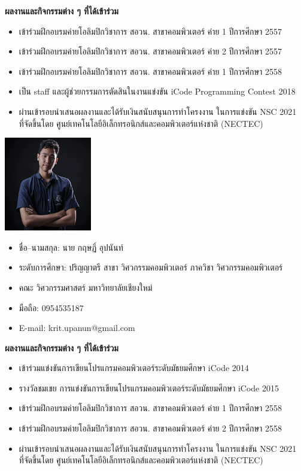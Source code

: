 \documentclass[semifinal]{cpecmu}
\begin{document}
\begin{biosketch}
\noindent \textbf{ผลงานและกิจกรรมต่าง ๆ ที่ได้เข้าร่วม}
\begin{itemize}
  \item เข้าร่วมฝึกอบรมค่ายโอลิมปิกวิชาการ สอวน. สาขาคอมพิวเตอร์ ค่าย 1 ปีการศึกษา 2557
  \item เข้าร่วมฝึกอบรมค่ายโอลิมปิกวิชาการ สอวน. สาขาคอมพิวเตอร์ ค่าย 2 ปีการศึกษา 2557
  \item เข้าร่วมฝึกอบรมค่ายโอลิมปิกวิชาการ สอวน. สาขาคอมพิวเตอร์ ค่าย 1 ปีการศึกษา 2558
  \item เป็น staff และผู้ช่วยกรรมการตัดสินในงานแข่งขัน iCode Programming Contest 2018
  \item ผ่านเข้ารอบนำเสนอผลงานและได้รับเงินสนับสนุนการทำโครงงาน ในการแข่งขัน NSC 2021\\
  ที่จัดขึ้นโดย ศูนย์เทคโนโลยีอิเล็กทรอนิกส์และคอมพิวเตอร์แห่งชาติ (NECTEC)
\end{itemize}
\newpage
\begin{center}
  \includegraphics[width=1.5in]{./images/krit_pic_resize.png}
\end{center}
\begin{itemize}[label={},leftmargin=*,labelsep=0pt]
  \item ชื่อ--นามสกุล: นาย กฤษฏิ์ อุปนันท์
  \item ระดับการศึกษา: ปริญญาตรี สาขา วิศวกรรมคอมพิวเตอร์ ภาควิชา วิศวกรรมคอมพิวเตอร์
  \item คณะ วิศวกรรมศาสตร์ มหาวิทยาลัยเชียงใหม่
  \item มือถือ: 0954535187
  \item E-mail: krit.upanun@gmail.com
\end{itemize}


\noindent \textbf{ผลงานและกิจกรรมต่าง ๆ ที่ได้เข้าร่วม}
\begin{itemize}
  \item เข้าร่วมแข่งขันการเขียนโปรแกรมคอมพิวเตอร์ระดับมัธยมศึกษา iCode 2014
  \item รางวัลชมเชย การแข่งขันการเขียนโปรแกรมคอมพิวเตอร์ระดับมัธยมศึกษา iCode 2015
  \item เข้าร่วมฝึกอบรมค่ายโอลิมปิกวิชาการ สอวน. สาขาคอมพิวเตอร์ ค่าย 1 ปีการศึกษา 2558
  \item เข้าร่วมฝึกอบรมค่ายโอลิมปิกวิชาการ สอวน. สาขาคอมพิวเตอร์ ค่าย 2 ปีการศึกษา 2558
  \item ผ่านเข้ารอบนำเสนอผลงานและได้รับเงินสนับสนุนการทำโครงงาน ในการแข่งขัน NSC 2021\\
  ที่จัดขึ้นโดย ศูนย์เทคโนโลยีอิเล็กทรอนิกส์และคอมพิวเตอร์แห่งชาติ (NECTEC)
\end{itemize}

\end{biosketch}
\fi %
\end{document}
